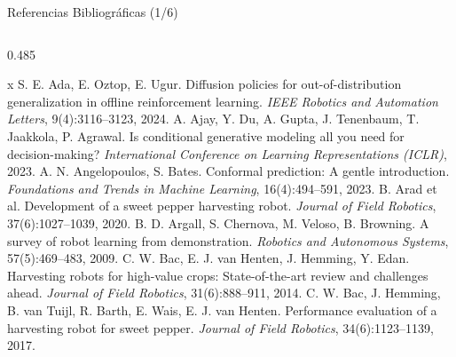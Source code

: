 \documentclass[aspectratio=169,10pt,xcolor={dvipsnames,table}]{beamer}
\begin{document}
\newcommand{\RefsFont}{\fontsize{5}{6}\selectfont}
\begin{frame}{Referencias Bibliográficas (1/6)}
  \begin{columns}[T, onlytextwidth]
    \begin{column}{0.485\textwidth}
      \RefsFont
      \begin{thebibliography}{x}\setlength{\itemsep}{0.8pt}
         S. E. Ada, E. Oztop, E. Ugur. \newblock Diffusion policies for out-of-distribution generalization in offline reinforcement learning. \newblock \emph{IEEE Robotics and Automation Letters}, 9(4):3116--3123, 2024.
         A. Ajay, Y. Du, A. Gupta, J. Tenenbaum, T. Jaakkola, P. Agrawal. \newblock Is conditional generative modeling all you need for decision-making? \newblock \emph{International Conference on Learning Representations (ICLR)}, 2023.
         A. N. Angelopoulos, S. Bates. \newblock Conformal prediction: A gentle introduction. \newblock \emph{Foundations and Trends in Machine Learning}, 16(4):494--591, 2023.
         B. Arad et al. \newblock Development of a sweet pepper harvesting robot. \newblock \emph{Journal of Field Robotics}, 37(6):1027--1039, 2020.
         B. D. Argall, S. Chernova, M. Veloso, B. Browning. \newblock A survey of robot learning from demonstration. \newblock \emph{Robotics and Autonomous Systems}, 57(5):469--483, 2009.
         C. W. Bac, E. J. van Henten, J. Hemming, Y. Edan. \newblock Harvesting robots for high-value crops: State-of-the-art review and challenges ahead. \newblock \emph{Journal of Field Robotics}, 31(6):888--911, 2014.
         C. W. Bac, J. Hemming, B. van Tuijl, R. Barth, E. Wais, E. J. van Henten. \newblock Performance evaluation of a harvesting robot for sweet pepper. \newblock \emph{Journal of Field Robotics}, 34(6):1123--1139, 2017.

\end{thebibliography}
\end{column}
\end{columns}
\end{frame}
\end{document}
